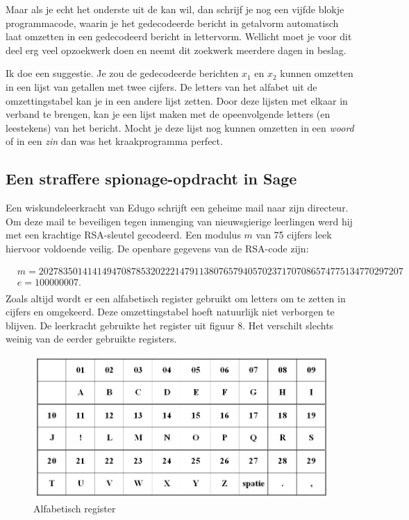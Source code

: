 Maar als je echt het onderste uit de kan wil, dan schrijf je nog een vijfde blokje programmacode, waarin je het gedecodeerde bericht in getalvorm automatisch laat omzetten in een gedecodeerd bericht in lettervorm. Wellicht moet je voor dit deel erg veel opzoekwerk doen en neemt dit zoekwerk meerdere dagen in beslag.

Ik doe een suggestie. Je zou de gedecodeerde berichten $x_1$ en $x_2$ kunnen omzetten in een lijst van getallen met twee cijfers. De letters van het alfabet uit de omzettingstabel kan je in een andere lijst zetten. Door deze lijsten met elkaar in verband te brengen, kan je een lijst maken met de opeenvolgende letters (en leestekens) van het bericht. Mocht je deze lijst nog kunnen omzetten in een \emph{woord} of in een \emph{zin} dan was het kraakprogramma perfect.



\subsection{Een straffere spionage-opdracht in Sage}

Een wiskundeleerkracht van Edugo schrijft een geheime mail naar zijn directeur. Om deze mail te beveiligen tegen inmenging van nieuwsgierige leerlingen werd hij met een krachtige RSA-sleutel gecodeerd. Een modulus $m$ van 75 cijfers leek hiervoor voldoende veilig. De openbare gegevens van de RSA-code zijn:

\[
\begin{aligned}
&m=202783501414149470878532022214791138076579405702371707086574775134770297207\\
&e=100000007.\\
\end{aligned}
\]
 \noindent Zoals altijd wordt er een alfabetisch register gebruikt om letters om te zetten in cijfers en omgekeerd. Deze omzettingstabel hoeft natuurlijk niet verborgen te blijven. De leerkracht gebruikte het register uit figuur 8. Het verschilt slechts weinig van de eerder gebruikte registers.
 
\begin{figure} [h]
\label{alfabet2}
\centering
\includegraphics[width=\textwidth]{alfabet3.jpg}
\caption{Alfabetisch register}
\end{figure}

